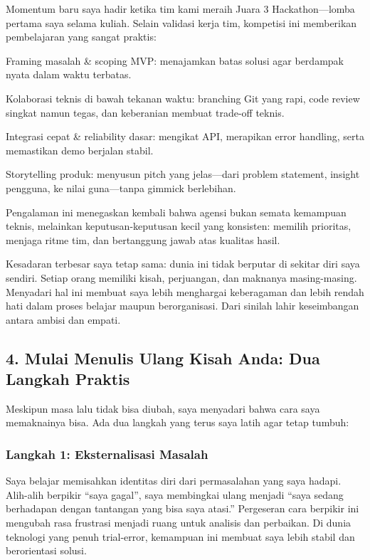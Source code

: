 \documentclass[
  letterpaper,
  DIV=11,
  numbers=noendperiod]{scrreprt}
\begin{document}
Momentum baru saya hadir ketika tim kami meraih Juara 3
Hackathon---lomba pertama saya selama kuliah. Selain validasi kerja tim,
kompetisi ini memberikan pembelajaran yang sangat praktis:

Framing masalah \& scoping MVP: menajamkan batas solusi agar berdampak
nyata dalam waktu terbatas.

Kolaborasi teknis di bawah tekanan waktu: branching Git yang rapi, code
review singkat namun tegas, dan keberanian membuat trade-off teknis.

Integrasi cepat \& reliability dasar: mengikat API, merapikan error
handling, serta memastikan demo berjalan stabil.

Storytelling produk: menyusun pitch yang jelas---dari problem statement,
insight pengguna, ke nilai guna---tanpa gimmick berlebihan.

Pengalaman ini menegaskan kembali bahwa agensi bukan semata kemampuan
teknis, melainkan keputusan-keputusan kecil yang konsisten: memilih
prioritas, menjaga ritme tim, dan bertanggung jawab atas kualitas hasil.

Kesadaran terbesar saya tetap sama: dunia ini tidak berputar di sekitar
diri saya sendiri. Setiap orang memiliki kisah, perjuangan, dan maknanya
masing-masing. Menyadari hal ini membuat saya lebih menghargai
keberagaman dan lebih rendah hati dalam proses belajar maupun
berorganisasi. Dari sinilah lahir keseimbangan antara ambisi dan empati.

\subsection{\texorpdfstring{\textbf{4. Mulai Menulis Ulang Kisah Anda:
Dua Langkah
Praktis}}{4. Mulai Menulis Ulang Kisah Anda: Dua Langkah Praktis}}\label{mulai-menulis-ulang-kisah-anda-dua-langkah-praktis}

Meskipun masa lalu tidak bisa diubah, saya menyadari bahwa cara saya
memaknainya bisa. Ada dua langkah yang terus saya latih agar tetap
tumbuh:

\subsubsection{Langkah 1: Eksternalisasi
Masalah}\label{langkah-1-eksternalisasi-masalah}

Saya belajar memisahkan identitas diri dari permasalahan yang saya
hadapi. Alih-alih berpikir ``saya gagal'', saya membingkai ulang menjadi
``saya sedang berhadapan dengan tantangan yang bisa saya atasi.''
Pergeseran cara berpikir ini mengubah rasa frustrasi menjadi ruang untuk
analisis dan perbaikan. Di dunia teknologi yang penuh trial-error,
kemampuan ini membuat saya lebih stabil dan berorientasi solusi.
\end{document}
